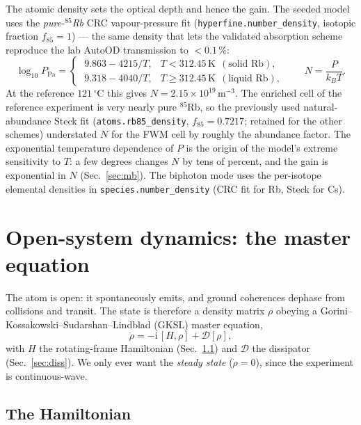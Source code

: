 \documentclass[11pt]{article}
\newcommand{\ii}{\mathrm{i}}
\newcommand{\code}[1]{\texttt{#1}}
\newcommand{\Dcal}{\mathcal{D}}
\begin{document}
The atomic density sets the optical depth and hence the gain. The seeded model
uses the \emph{pure-$^{85}$Rb} CRC vapour-pressure fit
(\code{hyperfine.number\_density}, isotopic fraction $f_{85}=1$) --- the same
density that lets the validated absorption scheme reproduce the lab AutoOD
transmission to $<0.1\,\%$:
\begin{equation}
\log_{10}P_{\text{Pa}} =
\begin{cases}
\;9.863-4215/T, & T<312.45\,\mathrm{K}\ \ (\text{solid Rb}),\\[3pt]
\;9.318-4040/T, & T\ge312.45\,\mathrm{K}\ \ (\text{liquid Rb}),
\end{cases}
\qquad
N=\frac{P}{k_B T}.
\label{eq:crc}
\end{equation}
At the reference $121\,^\circ$C this gives $N=2.15\times10^{19}\,\mathrm{m^{-3}}$.
The enriched cell of the reference experiment is very nearly pure $^{85}$Rb, so
the previously used natural-abundance Steck fit (\code{atoms.rb85\_density},
$f_{85}=0.7217$; retained for the other schemes) understated $N$ for the FWM cell
by roughly the abundance factor. The exponential temperature dependence of $P$ is
the origin of the model's extreme sensitivity to $T$: a few degrees changes $N$
by tens of percent, and the gain is exponential in $N$ (Sec.~\ref{sec:mb}). The
biphoton mode uses the per-isotope elemental densities in
\code{species.number\_density} (CRC fit for Rb, Steck for Cs).

\section{Open-system dynamics: the master equation}

The atom is open: it spontaneously emits, and ground coherences dephase from
collisions and transit. The state is therefore a density matrix $\rho$ obeying a
Gorini--Kossakowski--Sudarshan--Lindblad (GKSL) master equation,
\begin{equation}
\dot\rho=-\ii\,[H,\rho]+\Dcal[\rho],
\label{eq:gksl}
\end{equation}
with $H$ the rotating-frame Hamiltonian (Sec.~\ref{sec:H}) and $\Dcal$ the
dissipator (Sec.~\ref{sec:diss}). We only ever want the \emph{steady state}
($\dot\rho=0$), since the experiment is continuous-wave.

\subsection{The Hamiltonian}
\label{sec:H}
\end{document}
